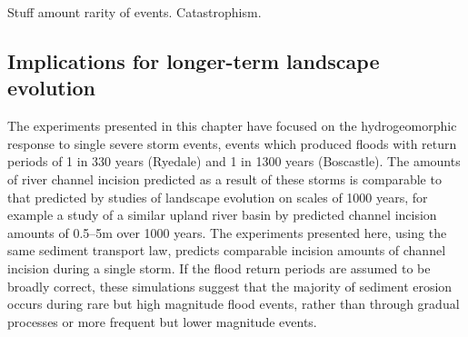 Stuff amount rarity of events. Catastrophism.

\subsection{Implications for longer-term landscape evolution}
The experiments presented in this chapter have focused on the hydrogeomorphic response to single severe storm events, events which produced floods with return periods of 1 in 330 years (Ryedale) and 1 in 1300 years (Boscastle). The amounts of river channel incision predicted as a result of these storms is comparable to that predicted by studies of landscape evolution on scales of 1000 years, for example a study of a similar upland river basin by \citep{coulthard2016sensitivity} predicted channel incision amounts of 0.5--5m over 1000 years. The experiments presented here, using the same sediment transport law, predicts comparable incision amounts of channel incision during a single storm. If the flood return periods are assumed to be broadly correct, these simulations suggest that the majority of sediment erosion occurs during rare but high magnitude flood events, rather than through gradual processes or more frequent but lower magnitude events.


